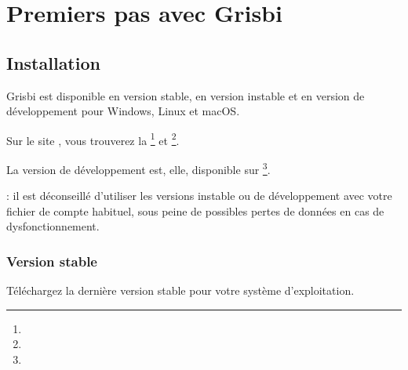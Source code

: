 

\chapter{Premiers pas avec Grisbi\label{start}}


\section{Installation\label{start-install}}


Grisbi est disponible en version stable, en version instable et en version de développement pour Windows, Linux et macOS.

Sur le site , vous trouverez la \footnote{\urlSourceForgeGrisbiStable} et \footnote{\urlSourceForgeGrisbiInstable}.

La version de développement est, elle, disponible sur \footnote{\urlGitHubGrisbi}.

\noindent
\Attention{}: il est déconseillé d'utiliser les versions instable ou de développement avec votre fichier de compte habituel, sous peine de possibles pertes de données en cas de dysfonctionnement.

\subsection{Version stable\label{start-install-stable}}

Téléchargez la dernière version stable pour votre système d'exploitation.

